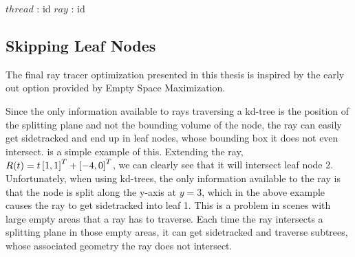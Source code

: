 \begin{algorithm}
  \caption{Converting a thread id to a ray id.}
  \label{alg:packet}
  \begin{algorithmic}
              {$thread$ : id}
              {$ray$ : id}
              {
              }
  \end{algorithmic}
\end{algorithm}


\subsection{Skipping Leaf Nodes}


The final ray tracer optimization presented in this thesis is inspired by the
early out option provided by Empty Space Maximization.


Since the only information available to rays traversing a kd-tree is the
position of the splitting plane and not the bounding volume of the node, the ray
can easily get sidetracked and end up in leaf nodes, whose bounding box it does
not even intersect.  is a simple example of
this. Extending the ray, $R(t) = t \left[1, 1 \right]^T + \left[-4, 0 \right]^T$, we can
clearly see that it will intersect leaf node 2. Unfortunately, when using
kd-trees, the only information available to the ray is that the node is split
along the y-axis at  $y=3$, which in the above example causes the ray to get
sidetracked into leaf 1. This is a problem in scenes with large empty areas that
a ray has to traverse. Each time the ray intersects a splitting plane in those
empty areas, it can get sidetracked and traverse subtrees, whose associated
geometry the ray does not intersect.

